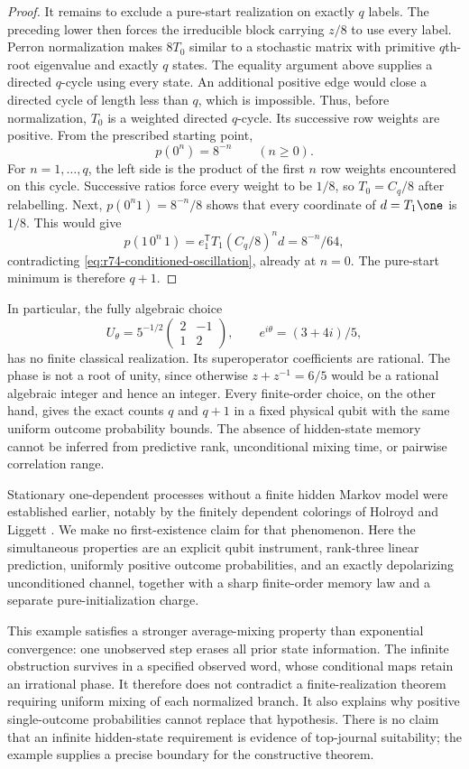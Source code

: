 \begin{proof}
It remains to exclude a pure-start realization on exactly $q$ labels.
The preceding lower then forces the irreducible block carrying $z/8$
to use every label. Perron normalization makes $8T_0$ similar to a
stochastic matrix with primitive $q$th-root eigenvalue and exactly $q$
states. The equality argument above supplies a directed $q$-cycle using
every state. An additional positive edge would close a directed cycle of
length less than $q$, which is impossible. Thus, before normalization,
$T_0$ is a weighted directed $q$-cycle. Its successive row weights are
positive. From the prescribed starting point,
\[
 p(0^n)=8^{-n}\qquad(n\ge0).
\]
For $n=1,\ldots,q$, the left side is the product of the first $n$ row
weights encountered on this cycle. Successive ratios force every weight
to be $1/8$, so $T_0=C_q/8$ after relabelling. Next,
$p(0^n1)=8^{-n}/8$ shows that every coordinate of $d=T_1\one$ is
$1/8$. This would give
\[
 p(1\,0^n\,1)
 =e_1^{\mathsf T}T_1(C_q/8)^nd
 =8^{-n}/64,
\]
contradicting \eqref{eq:r74-conditioned-oscillation}, already at $n=0$.
The pure-start minimum is therefore $q+1$.
\end{proof}

In particular, the fully algebraic choice
\[
 U_\theta=5^{-1/2}\begin{pmatrix}2&-1\\1&2\end{pmatrix},
 \qquad e^{i\theta}=(3+4i)/5,
\]
has no finite classical realization. Its superoperator coefficients are
rational. The phase is not a root of unity, since otherwise
$z+z^{-1}=6/5$ would be a rational algebraic integer and hence an integer.
Every finite-order choice, on the other hand, gives the exact counts
$q$ and $q+1$ in a fixed physical qubit with the same uniform outcome
probability bounds. The absence of hidden-state memory cannot be inferred
from predictive rank, unconditional mixing time, or pairwise correlation
range.

Stationary one-dependent processes without a finite hidden Markov model
were established earlier, notably by the finitely dependent colorings of
Holroyd and Liggett \cite{HolroydLiggett16}. We make no first-existence
claim for that phenomenon. Here the simultaneous properties are an explicit
qubit instrument, rank-three linear prediction, uniformly positive outcome
probabilities, and an exactly depolarizing unconditioned channel, together
with a sharp finite-order memory law and a separate pure-initialization
charge.

This example satisfies a stronger average-mixing property than exponential
convergence: one unobserved step erases all prior state information. The
infinite obstruction survives in a specified observed word, whose
conditional maps retain an irrational phase. It therefore does not
contradict a finite-realization theorem requiring uniform mixing of each
normalized branch. It also explains why positive single-outcome
probabilities cannot replace that hypothesis. There is no claim that an
infinite hidden-state requirement is evidence of top-journal suitability;
the example supplies a precise boundary for the constructive theorem.

